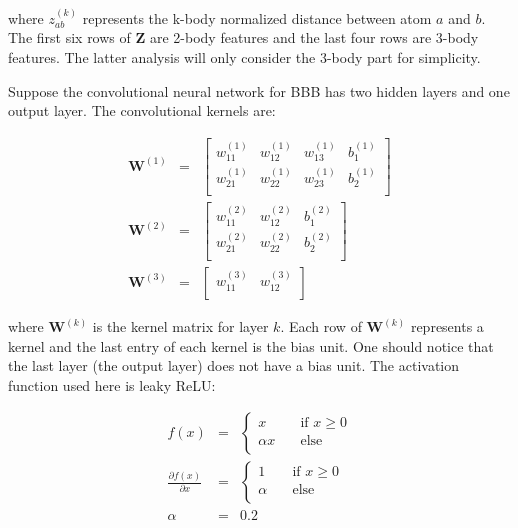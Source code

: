 \documentclass{article}
\begin{document}
\noindent where $z^(k)_{ab}$ represents the k-body normalized distance between atom $a$ and 
$b$. The first six rows of \textbf{Z} are 2-body features and the last four rows are 3-body
features. The latter analysis will only consider the 3-body part for simplicity.

Suppose the convolutional neural network for BBB has two hidden layers and one output layer.
The convolutional kernels are:

\begin{eqnarray}
\mathbf{W}^{(1)} & = & \left[\begin{array}{cccc}
	w^{(1)}_{11} & w^{(1)}_{12} & w^{(1)}_{13} & b^{(1)}_{1} \\
	w^{(1)}_{21} & w^{(1)}_{22} & w^{(1)}_{23} & b^{(1)}_{2} \\
\end{array}
\right] \\
\mathbf{W}^{(2)} & = & \left[\begin{array}{ccc}
	w^{(2)}_{11} & w^{(2)}_{12} & b^{(2)}_{1} \\
	w^{(2)}_{21} & w^{(2)}_{22} & b^{(2)}_{2} \\
\end{array}
\right] \\
\mathbf{W}^{(3)} & = & \left[\begin{array}{cc}
	w^{(3)}_{11} & w^{(3)}_{12} \\
\end{array}
\right]
\end{eqnarray}

\noindent where $\mathbf{W}^{(k)}$ is the kernel matrix for layer $k$. Each row of  
$\mathbf{W}^{(k)}$ represents a kernel and the last entry of each kernel is the bias unit. 
One should notice that the last layer (the output layer) does not have a bias unit.
The activation function used here is leaky ReLU:

\begin{eqnarray}
f(x) & = & \begin{cases}
	x & \quad \text{if } x \geq 0 \\
	\alpha x & \quad \text{else} \\
\end{cases} \\
\frac{\partial{f(x)}}{\partial{x}} & = & \begin{cases}
	1 & \quad \text{if } x \geq 0 \\
	\alpha & \quad \text{else} \\
\end{cases} \\
\alpha & = & 0.2
\end{eqnarray}
\end{document}
